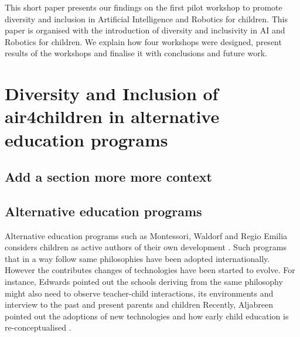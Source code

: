 \documentclass[conference]{IEEEtran}
\begin{document}
This short paper presents our findings on the first pilot workshop to promote diversity and inclusion in Artificial Intelligence and Robotics for children.
This paper is organised with the introduction of diversity and inclusivity in AI and Robotics for children. 
We explain how four workshops were designed, present results of the workshops and finalise it with conclusions and future work.

\section{Diversity and Inclusion of air4children in alternative education programs}

\subsection{Add a section more more context}


\subsection{Alternative education programs}
Alternative education programs such as Montessori, Waldorf and Regio Emilia considers children as active authors of their own development \cite{edwards2002}.
Such programs that in a way follow same philosophies have been adopted internationally.
However the contributes changes of technologies have been started to evolve. 
For instance, Edwards pointed out the schools deriving from the same philosophy might also need to observe teacher-child interactions, its environments and interview to the past and present parents and children \cite{edwards2002}
Recently, Aljabreen pointed out the adoptions of new technologies and how early child education is re-conceptualised \cite{Aljabreen2020}.
\end{document}
